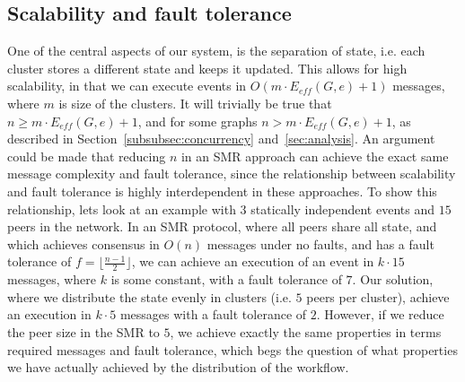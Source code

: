 \documentclass{article}
\begin{document}

	\subsection{Scalability and fault tolerance}
    One of the central aspects of our system, is the separation of state, i.e. each cluster stores a different state and keeps it updated.
   	This allows for high scalability, in that we can execute events in $O(m \cdot E_{eff}(G,e) + 1)$ messages, where $m$ is size of the clusters.
   	It will trivially be true that $n \geq m \cdot E_{eff}(G,e) + 1$, and for some graphs $n > m \cdot E_{eff}(G,e) + 1$, as described in Section~\ref{subsubsec:concurrency} and~\ref{sec:analysis}.
    An argument could be made that reducing $n$ in an SMR approach can achieve the exact same message complexity and fault tolerance, since the relationship between scalability and fault tolerance is highly interdependent in these approaches.
    To show this relationship, lets look at an example with $3$ statically independent events and $15$ peers in the network.
    In an SMR protocol, where all peers share all state, and which achieves consensus in $O(n)$ messages under no faults, and has a fault tolerance of $f = \lfloor \frac{n-1}{2} \rfloor$, we can achieve an execution of an event in $k \cdot 15$ messages, where $k$ is some constant, with a fault tolerance of $7$.
    Our solution, where we distribute the state evenly in clusters (i.e. $5$ peers per cluster), achieve an execution in $k \cdot 5$ messages with a fault tolerance of $2$.
    However, if we reduce the peer size in the SMR to $5$, we achieve exactly the same properties in terms required messages and fault tolerance, which begs the question of what properties we have actually achieved by the distribution of the workflow.
\end{document}
